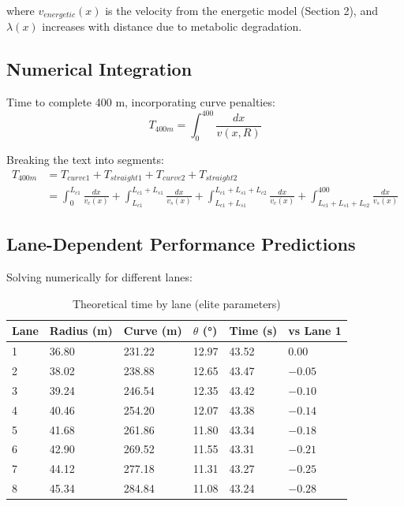 where $v_{energetic}(x)$ is the velocity from the energetic model (Section 2), and $\lambda(x)$ increases with distance due to metabolic degradation.

\subsection{Numerical Integration}

Time to complete 400 m, incorporating curve penalties:
\begin{equation}
T_{400m} = \int_0^{400} \frac{dx}{v(x,R)}
\end{equation}

Breaking the text into segments:
\begin{align}
T_{400m} &= T_{curve1} + T_{straight1} + T_{curve2} + T_{straight2} \\
&= \int_0^{L_{c1}} \frac{dx}{v_c(x)} + \int_{L_{c1}}^{L_{c1}+L_{s1}} \frac{dx}{v_s(x)} + \int_{L_{c1}+L_{s1}}^{L_{c1}+L_{s1}+L_{c2}} \frac{dx}{v_c(x)} + \int_{L_{c1}+L_{s1}+L_{c2}}^{400} \frac{dx}{v_s(x)}
\end{align}

\subsection{Lane-Dependent Performance Predictions}

Solving numerically for different lanes:

\begin{table}[H]
\centering
\caption{Theoretical time by lane (elite parameters)}
\begin{tabular}{@{}llllll@{}}
\toprule
\textbf{Lane} & \textbf{Radius (m)} & \textbf{Curve (m)} & \textbf{$\theta$ (°)} & \textbf{Time (s)} & \textbf{vs Lane 1} \\
\midrule
1 & 36.80 & 231.22 & 12.97 & 43.52 & 0.00 \\
2 & 38.02 & 238.88 & 12.65 & 43.47 & $-0.05$ \\
3 & 39.24 & 246.54 & 12.35 & 43.42 & $-0.10$ \\
4 & 40.46 & 254.20 & 12.07 & 43.38 & $-0.14$ \\
5 & 41.68 & 261.86 & 11.80 & 43.34 & $-0.18$ \\
6 & 42.90 & 269.52 & 11.55 & 43.31 & $-0.21$ \\
7 & 44.12 & 277.18 & 11.31 & 43.27 & $-0.25$ \\
8 & 45.34 & 284.84 & 11.08 & 43.24 & $-0.28$ \\
\bottomrule
\end{tabular}
\end{table}


